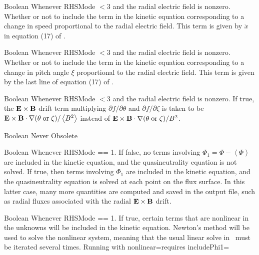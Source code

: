 \myhrule

{Boolean}
{\true}
{Whenever {\ttfamily RHSMode} $<3$ and the radial electric field is nonzero.}
{Whether or not to include the term in the kinetic equation corresponding to a change
in speed proportional to the radial electric field.  This term is given by $\dot{x}$ in
equation (17) of \cite{sfincsPaper}.}

\myhrule

{Boolean}
{\true}
{Whenever {\ttfamily RHSMode} $<3$ and the radial electric field is nonzero.}
{Whether or not to include the term in the kinetic equation corresponding to a change
in pitch angle $\xi$ proportional to the radial electric field.  This term is given by the last line of
equation (17) of \cite{sfincsPaper}.}

\myhrule

{Boolean}
{\false}
{Whenever {\ttfamily RHSMode} $<3$ and the radial electric field is nonzero.}
{If true, the ${\mathbf E}\times{\mathbf B}$ drift term 
multiplying $\partial f/\partial \theta$ and  $\partial f/\partial \zeta$
is taken to be ${\mathbf E}\times{\mathbf B}\cdot \nabla (\theta \;\mbox{or} \;\zeta) / \left< B^2 \right>$
instead of 
 ${\mathbf E}\times{\mathbf B}\cdot \nabla (\theta \;\mbox{or} \;\zeta) /B^2$.
}

\myhrule

{Boolean}
{\false}
{Never}
{Obsolete}

\myhrule

{Boolean}
{\false}
{Whenever {\ttfamily RHSMode} == 1.}
{If false, no terms involving $\Phi_1 = \Phi-\left<\Phi\right>$ are included in the kinetic equation,
and the quasineutrality equation is not solved.  If true, then terms involving $\Phi_1$ are included
in the kinetic equation, and the quasineutrality equation is solved at each point on the flux surface.
In this latter case, many more quantities are computed and saved in the output file, such as radial fluxes
associated with the radial ${\mathbf E}\times{\mathbf B}$ drift.}

\myhrule

{Boolean}
{\false}
{Whenever {\ttfamily RHSMode} == 1.}
{If true, certain terms that are nonlinear in the unknowns will be included in the kinetic equation.
Newton's method will be used to solve the nonlinear system, meaning that the usual linear solve in \sfincs~must
be iterated several times.
Running with {\ttfamily nonlinear}=\true requires {\ttfamily includePhi1}=\true
}

